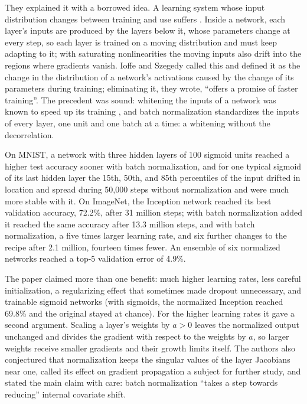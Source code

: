 \begin{refsection}
They explained it with a borrowed idea. A learning system whose input distribution changes between training and use suffers  \parencite{Shimodaira2000}. Inside a network, each layer's inputs are produced by the layers below it, whose parameters change at every step, so each layer is trained on a moving distribution and must keep adapting to it; with saturating nonlinearities the moving inputs also drift into the regions where gradients vanish. Ioffe and Szegedy called this  and defined it as the change in the distribution of a network's activations caused by the change of its parameters during training; eliminating it, they wrote, \enquote{offers a promise of faster training}. The precedent was sound: whitening the inputs of a network was known to speed up its training \parencite{LeCunEtAl1998}, and batch normalization standardizes the inputs of every layer, one unit and one batch at a time: a whitening without the decorrelation.

\begin{finding}\label{fd:mechanisms:ioffe}
On MNIST, a network with three hidden layers of 100 sigmoid units reached a higher test accuracy sooner with batch normalization, and for one typical sigmoid of its last hidden layer the 15th, 50th, and 85th percentiles of the input drifted in location and spread during 50,000 steps without normalization and were much more stable with it. On ImageNet, the Inception network reached its best validation accuracy, 72.2\%, after 31 million steps; with batch normalization added it reached the same accuracy after 13.3 million steps, and with batch normalization, a five times larger learning rate, and six further changes to the recipe after 2.1 million, fourteen times fewer. An ensemble of six normalized networks reached a top-5 validation error of 4.9\%.
\end{finding}

The paper claimed more than one benefit: much higher learning rates, less careful initialization, a regularizing effect that sometimes made dropout unnecessary, and trainable sigmoid networks (with sigmoids, the normalized Inception reached 69.8\% and the original stayed at chance). For the higher learning rates it gave a second argument. Scaling a layer's weights by $a>0$ leaves the normalized output unchanged and divides the gradient with respect to the weights by $a$, so larger weights receive smaller gradients and their growth limits itself. The authors also conjectured that normalization keeps the singular values of the layer Jacobians near one, called its effect on gradient propagation a subject for further study, and stated the main claim with care: batch normalization \enquote{takes a step towards reducing} internal covariate shift.


\end{refsection}
